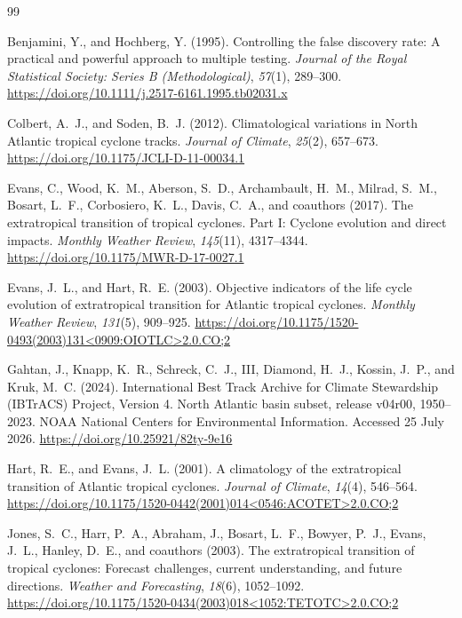 \documentclass[11pt]{article}
\begin{document}
\begin{thebibliography}{99}

Benjamini, Y., and Hochberg, Y. (1995).
Controlling the false discovery rate: A practical and powerful approach to multiple testing.
\textit{Journal of the Royal Statistical Society: Series B (Methodological)}, \textit{57}(1), 289--300.
\url{https://doi.org/10.1111/j.2517-6161.1995.tb02031.x}

Colbert, A.~J., and Soden, B.~J. (2012).
Climatological variations in North Atlantic tropical cyclone tracks.
\textit{Journal of Climate}, \textit{25}(2), 657--673.
\url{https://doi.org/10.1175/JCLI-D-11-00034.1}

Evans, C., Wood, K.~M., Aberson, S.~D., Archambault, H.~M., Milrad, S.~M., Bosart, L.~F., Corbosiero, K.~L., Davis, C.~A., and coauthors (2017).
The extratropical transition of tropical cyclones. Part I: Cyclone evolution and direct impacts.
\textit{Monthly Weather Review}, \textit{145}(11), 4317--4344.
\url{https://doi.org/10.1175/MWR-D-17-0027.1}

Evans, J.~L., and Hart, R.~E. (2003).
Objective indicators of the life cycle evolution of extratropical transition for Atlantic tropical cyclones.
\textit{Monthly Weather Review}, \textit{131}(5), 909--925.
\url{https://doi.org/10.1175/1520-0493(2003)131<0909:OIOTLC>2.0.CO;2}

Gahtan, J., Knapp, K.~R., Schreck, C.~J., III, Diamond, H.~J., Kossin, J.~P., and Kruk, M.~C. (2024).
International Best Track Archive for Climate Stewardship (IBTrACS) Project, Version 4.
North Atlantic basin subset, release v04r00, 1950--2023.
NOAA National Centers for Environmental Information.
Accessed 25 July 2026.
\url{https://doi.org/10.25921/82ty-9e16}

Hart, R.~E., and Evans, J.~L. (2001).
A climatology of the extratropical transition of Atlantic tropical cyclones.
\textit{Journal of Climate}, \textit{14}(4), 546--564.
\url{https://doi.org/10.1175/1520-0442(2001)014<0546:ACOTET>2.0.CO;2}

Jones, S.~C., Harr, P.~A., Abraham, J., Bosart, L.~F., Bowyer, P.~J., Evans, J.~L., Hanley, D.~E., and coauthors (2003).
The extratropical transition of tropical cyclones: Forecast challenges, current understanding, and future directions.
\textit{Weather and Forecasting}, \textit{18}(6), 1052--1092.
\url{https://doi.org/10.1175/1520-0434(2003)018<1052:TETOTC>2.0.CO;2}


\end{thebibliography}
\end{document}
